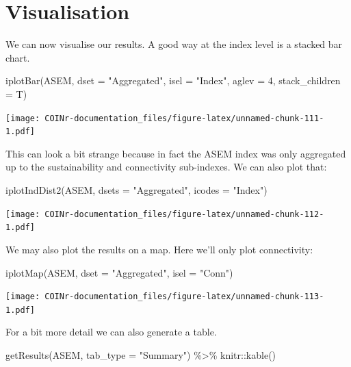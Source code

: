 \documentclass[
]{book}
\newenvironment{Shaded}{\begin{snugshade}}{\end{snugshade}}
\newcommand{\AttributeTok}[1]{\textcolor[rgb]{0.77,0.63,0.00}{#1}}
\newcommand{\DecValTok}[1]{\textcolor[rgb]{0.00,0.00,0.81}{#1}}
\newcommand{\FunctionTok}[1]{\textcolor[rgb]{0.00,0.00,0.00}{#1}}
\newcommand{\NormalTok}[1]{#1}
\newcommand{\SpecialCharTok}[1]{\textcolor[rgb]{0.00,0.00,0.00}{#1}}
\newcommand{\StringTok}[1]{\textcolor[rgb]{0.31,0.60,0.02}{#1}}
\begin{document}
\hypertarget{visualisation-1}{%
\section{Visualisation}\label{visualisation-1}}

We can now visualise our results. A good way at the index level is a stacked bar chart.

\begin{Shaded}
\begin{Highlighting}[]
\FunctionTok{iplotBar}\NormalTok{(ASEM, }\AttributeTok{dset =} \StringTok{"Aggregated"}\NormalTok{, }\AttributeTok{isel =} \StringTok{"Index"}\NormalTok{, }\AttributeTok{aglev =} \DecValTok{4}\NormalTok{, }\AttributeTok{stack\_children =}\NormalTok{ T)}
\end{Highlighting}
\end{Shaded}

\texttt{[image: COINr-documentation\_files/figure-latex/unnamed-chunk-111-1.pdf]}

This can look a bit strange because in fact the ASEM index was only aggregated up to the sustainability and connectivity sub-indexes. We can also plot that:

\begin{Shaded}
\begin{Highlighting}[]
\FunctionTok{iplotIndDist2}\NormalTok{(ASEM, }\AttributeTok{dsets =} \StringTok{"Aggregated"}\NormalTok{, }\AttributeTok{icodes =} \StringTok{"Index"}\NormalTok{)}
\end{Highlighting}
\end{Shaded}

\texttt{[image: COINr-documentation\_files/figure-latex/unnamed-chunk-112-1.pdf]}

We may also plot the results on a map. Here we'll only plot connectivity:

\begin{Shaded}
\begin{Highlighting}[]
\FunctionTok{iplotMap}\NormalTok{(ASEM, }\AttributeTok{dset =} \StringTok{"Aggregated"}\NormalTok{, }\AttributeTok{isel =} \StringTok{"Conn"}\NormalTok{)}
\end{Highlighting}
\end{Shaded}

\texttt{[image: COINr-documentation\_files/figure-latex/unnamed-chunk-113-1.pdf]}

For a bit more detail we can also generate a table.

\begin{Shaded}
\begin{Highlighting}[]
\FunctionTok{getResults}\NormalTok{(ASEM, }\AttributeTok{tab\_type =} \StringTok{"Summary"}\NormalTok{) }\SpecialCharTok{\%\textgreater{}\%}
\NormalTok{  knitr}\SpecialCharTok{::}\FunctionTok{kable}\NormalTok{()}
\end{Highlighting}
\end{Shaded}
\end{document}
